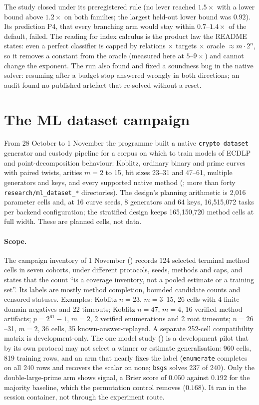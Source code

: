 The study closed under its preregistered rule (no lever reached $1.5\times$
with a lower bound above $1.2\times$ on both families; the largest held-out
lower bound was $0.92$). Its prediction P4, that every branching arm would
stay within $0.7$--$1.4\times$ of the default, failed. The reading for index
calculus is the product law the README states: even a perfect classifier is
capped by relations $\times$ targets $\times$ oracle $\approx m\cdot2^n$, so it removes
a constant from the oracle (measured here at $5$--$9\times$) and cannot change
the exponent. The run also found and fixed a soundness bug in the native
solver: resuming after a budget stop answered wrongly in both directions;
an audit found no published artefact that re-solved without a reset.

\section{The ML dataset campaign}\label{sec:ln-dataset}

From 28 October to 1 November the programme built a native
\texttt{crypto dataset} generator and custody pipeline for a corpus on
which to train models of ECDLP and point-decomposition behaviour: Koblitz,
ordinary binary and prime curves with paired twists, arities $m=2$ to 15, bit
sizes 23--31 and 47--61, multiple generators and keys, and every supported
native method (; more than forty
\texttt{research/ml\_dataset\_*} directories). The design's planning
arithmetic is 2{,}016 parameter cells and, at 16 curve seeds, 8 generators
and 64 keys, 16{,}515{,}072 tasks per backend configuration; the stratified
design keeps 165{,}150{,}720 method cells at full width. These are planned
cells, not data.

\paragraph{Scope.} The campaign inventory of 1 November
() records
124 selected terminal method cells in seven cohorts, under different
protocols, seeds, methods and caps, and states that the count ``is a
coverage inventory, not a pooled estimate or a training set''. Its labels are
mostly method completion, bounded candidate counts and censored statuses.
Examples: Koblitz $n=23$, $m=3$--15, 26 cells with 4 finite-domain negatives
and 22 timeouts; Koblitz $n=47$, $m=4$, 16 verified method artifacts;
$p=2^{61}-1$, $m=2$, 2 verified enumerations and 2 root timeouts; $n=26$--31,
$m=2$, 36 cells, 35 known-answer-replayed. A separate 252-cell compatibility
matrix is development-only. The one model study
() is a development
pilot that by its own protocol may not select a winner or estimate
generalisation: 960 cells, 819 training rows, and an arm that nearly fixes the
label (\texttt{enumerate} completes on all 240 rows and recovers the scalar
on none; \texttt{bsgs} solves 237 of 240). Only the double-large-prime arm
shows signal, a Brier score of $0.050$ against $0.192$ for the majority
baseline, which the permutation control removes ($0.168$). It ran in the
session container, not through the experiment route.


